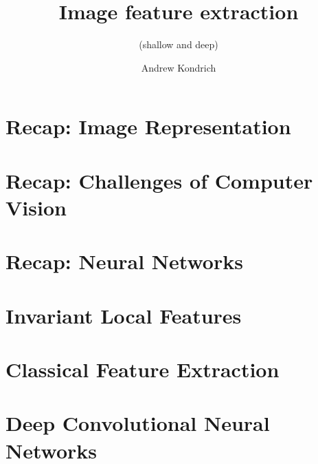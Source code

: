 \documentclass[11pt]{beamer}
\title[AI4ALL Computer Vision]{Image feature extraction}
\subtitle{(shallow and deep)}
\author[Andrew Kondrich]{Andrew Kondrich}
\begin{document}


\section{Recap: Image Representation}


\section{Recap: Challenges of Computer Vision}


\section{Recap: Neural Networks}


\section{Invariant Local Features}

\section{Classical Feature Extraction}


\section{Deep Convolutional Neural Networks}


\begin{frame}
\titlepage 
\end{frame}
\end{document}
